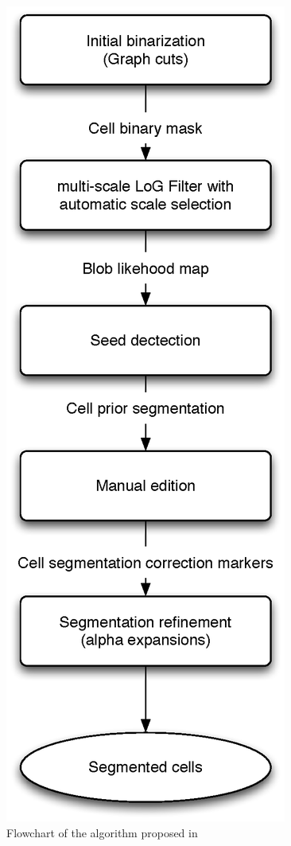 \begin{figure}[h]
\begin{center}
\leavevmode
\includegraphics[height=0.75\textheight]{pictures/farsightFlowchart}
\end{center}
\caption{Flowchart of the algorithm proposed in~\cite{al2009improved}}
\label{fig:farsightFlowchart}
\end{figure}
